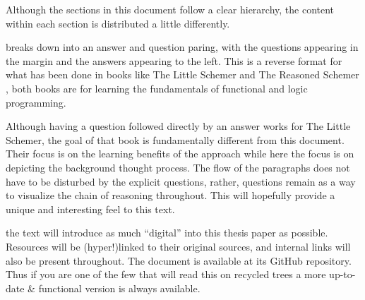 
Although the sections in this document follow a clear hierarchy, the content within each section is distributed a little differently.

 breaks down into an answer and question paring, with the questions appearing in the margin and the answers appearing to the left. This is a reverse format for what has been done in books like The Little Schemer \citep{littleSchemer} and The Reasoned Schemer \citep{reasonedSchemer}, both books are for learning the fundamentals of functional and logic programming.

Although having a question followed directly by an answer works for The Little Schemer, the goal of that book is fundamentally different from this document. Their focus is on the learning benefits of the approach while here the focus is on depicting the background thought process. The flow of the paragraphs does not have to be disturbed by the explicit questions, rather, questions remain as a way to visualize the chain of reasoning throughout. This will hopefully provide a unique and interesting feel to this text.

 the text will introduce as much ``digital'' into this thesis paper as possible. Resources will be (hyper!)linked to their original sources, and internal links will also be present throughout. The document is available at its GitHub repository. Thus if you are one of the few that will read this on recycled trees a more up-to-date \& functional version is always available.